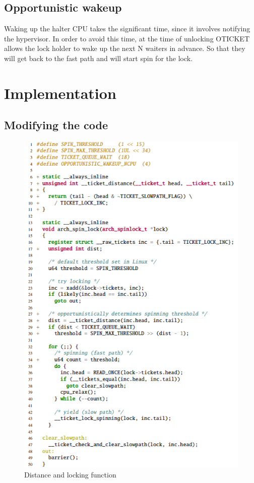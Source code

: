 \documentclass[conference]{IEEEtran}
\begin{document}
\subsection{Opportunistic wakeup}
Waking up the halter CPU takes the significant time, since it involves notifying
the hypervisor.
In order to avoid this time, at the time of unlocking OTICKET allows the lock
holder to wake up the next N waiters in advance.
So that they will get back to the fast path and will start spin for the lock.
\newline

\section{Implementation}
\subsection{Modifying the code}
\begin{figure}[!h]
    \centering
    \includegraphics[scale = 0.88]{Implementation_1.png}
    \caption{Distance and locking function}
    \label{Fig.2}
\end{figure}
\FloatBarrier
\end{document}
